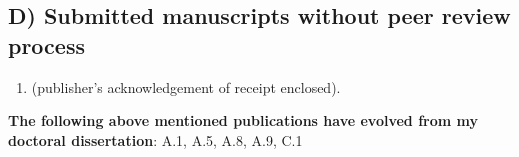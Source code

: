 \documentclass[12pt]{article}
\begin{document}
\subsection*{D) Submitted manuscripts without peer review process}
\begin{enumerate}
    \item {} (publisher's acknowledgement of receipt enclosed).
\end{enumerate}


\noindent
\textbf{The following above mentioned publications have evolved from my doctoral dissertation}: A.1, A.5, A.8, A.9, C.1
\end{document}
